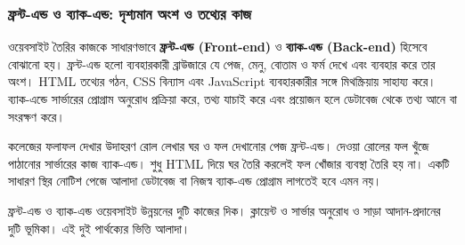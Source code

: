 \subsubsection{ফ্রন্ট-এন্ড ও ব্যাক-এন্ড: দৃশ্যমান অংশ ও তথ্যের কাজ}
ওয়েবসাইট তৈরির কাজকে সাধারণভাবে \textbf{ফ্রন্ট-এন্ড (Front-end)} ও \textbf{ব্যাক-এন্ড (Back-end)} হিসেবে বোঝানো হয়। ফ্রন্ট-এন্ড হলো ব্যবহারকারী ব্রাউজারে যে পেজ, মেনু, বোতাম ও ফর্ম দেখে এবং ব্যবহার করে তার অংশ। HTML তথ্যের গঠন, CSS বিন্যাস এবং JavaScript ব্যবহারকারীর সঙ্গে মিথস্ক্রিয়ায় সাহায্য করে। ব্যাক-এন্ডে সার্ভারের প্রোগ্রাম অনুরোধ প্রক্রিয়া করে, তথ্য যাচাই করে এবং প্রয়োজন হলে ডেটাবেজ থেকে তথ্য আনে বা সংরক্ষণ করে।

\begin{keypointbox}{কলেজের ফলাফল দেখার উদাহরণ}
রোল লেখার ঘর ও ফল দেখানোর পেজ ফ্রন্ট-এন্ড। দেওয়া রোলের ফল খুঁজে পাঠানোর সার্ভারের কাজ ব্যাক-এন্ড। শুধু HTML দিয়ে ঘর তৈরি করলেই ফল খোঁজার ব্যবস্থা তৈরি হয় না। একটি সাধারণ স্থির নোটিশ পেজে আলাদা ডেটাবেজ বা নিজস্ব ব্যাক-এন্ড প্রোগ্রাম লাগতেই হবে এমন নয়।
\end{keypointbox}
ফ্রন্ট-এন্ড ও ব্যাক-এন্ড ওয়েবসাইট উন্নয়নের দুটি কাজের দিক। ক্লায়েন্ট ও সার্ভার অনুরোধ ও সাড়া আদান-প্রদানের দুটি ভূমিকা। এই দুই পার্থক্যের ভিত্তি আলাদা।


